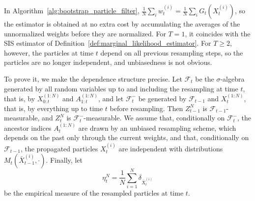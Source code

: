 In Algorithm~\ref{alg:bootstrap_particle_filter}, $\frac{1}{N}\sum_iw_t^{(i)} = \frac{1}{N}\sum_iG_t(X_t^{(i)})$, so the estimator is obtained at no extra cost by accumulating the averages of the unnormalized weights before they are normalized. For $T=1$, it coincides with the SIS estimator of Definition~\ref{def:marginal_likelihood_estimator}. For $T\ge2$, however, the particles at time $t$ depend on all previous resampling steps, so the particles are no longer independent, and unbiasedness is not obvious.

To prove it, we make the dependence structure precise. Let $\mathcal{F}_t$ be the $\sigma$-algebra generated by all random variables up to and including the resampling at time $t$, that is, by $X_{0:t}^{(1:N)}$ and $A_{1:t}^{(1:N)}$, and let $\mathcal{F}_t^-$ be generated by $\mathcal{F}_{t-1}$ and $X_t^{(1:N)}$, that is, by everything up to time $t$ before resampling. Then $Z_{t-1}^N$ is $\mathcal{F}_{t-1}$-measurable, and $Z_t^N$ is $\mathcal{F}_t^-$-measurable. We assume that, conditionally on $\mathcal{F}_t^-$, the ancestor indices $A_t^{(1:N)}$ are drawn by an unbiased resampling scheme, which depends on the past only through the current weights, and that, conditionally on $\mathcal{F}_{t-1}$, the propagated particles $X_t^{(i)}$ are independent with distributions $M_t(\bar{X}_{t-1}^{(i)},\cdot)$. Finally, let
\begin{equation}
    \eta_t^N = \frac{1}{N}\sum_{i=1}^{N}\delta_{\bar{X}_t^{(i)}}
\end{equation}
be the empirical measure of the resampled particles at time $t$.

